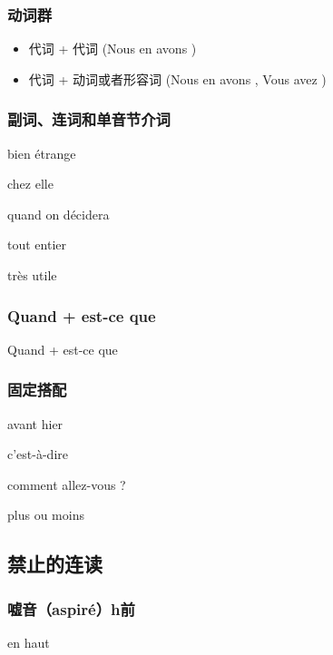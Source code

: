 \subsubsection{动词群}

\begin{itemize}
\item 代词 + 代词 (Nous en avons \textipa{[nu z\~a na v\~O]})
\item 代词 + 动词或者形容词 (Nous en avons \textipa{[nu z\~a na v\~O]}, Vous avez \textipa{[nu za ve]})
\end{itemize}

\subsubsection{副词、连词和单音节介词}

bien étrange \textipa{[bj\~E ne tr\~a Z]}

chez elle \textipa{[Se zEl]}

quand on décidera \textipa{[k\~a t\~O de si d@ ra]}

tout entier \textipa{[tu t\~a ti tje]}

très utile 	


\subsubsection{Quand + est-ce que }

Quand + est-ce que \textipa{[k\~a tEsk]}


\subsubsection{固定搭配}

avant hier \textipa{[a v\~a tjEr]}

c’est-à-dire	\textipa{[sE ta dir]}

comment allez-vous ? \textipa{[cO m\~a ta le vu]}

plus ou moins	\textipa{[ply zu mw\~E]}


\subsection{禁止的连读}


\subsubsection{嘘音（aspiré）h前}

en haut \textipa{[\~a o]}

